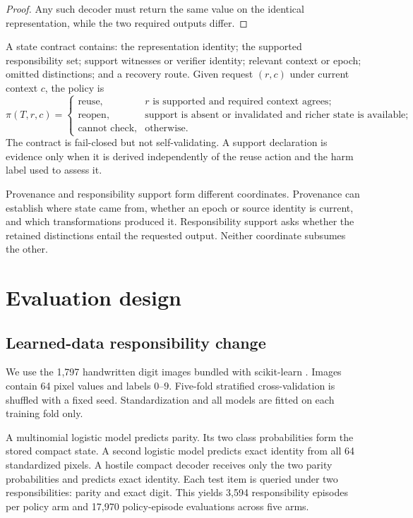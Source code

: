 \documentclass[10pt]{article}
\begin{document}
\begin{proof}
Any such decoder must return the same value on the identical representation, while the two required outputs differ.
\end{proof}

A state contract contains: the representation identity; the supported responsibility set; support witnesses or verifier identity; relevant context or epoch; omitted distinctions; and a recovery route. Given request $(r,c)$ under current context $c$, the policy is
\[
\pi(T,r,c)=
\begin{cases}
\text{reuse}, & r\text{ is supported and required context agrees};\\
\text{reopen}, & \text{support is absent or invalidated and richer state is available};\\
\text{cannot check}, & \text{otherwise}.
\end{cases}
\]
The contract is fail-closed but not self-validating. A support declaration is evidence only when it is derived independently of the reuse action and the harm label used to assess it.

Provenance and responsibility support form different coordinates. Provenance can establish where state came from, whether an epoch or source identity is current, and which transformations produced it. Responsibility support asks whether the retained distinctions entail the requested output. Neither coordinate subsumes the other.

\section{Evaluation design}

\subsection{Learned-data responsibility change}

We use the 1,797 handwritten digit images bundled with scikit-learn \citep{pedregosa2011scikit}. Images contain 64 pixel values and labels $0$--$9$. Five-fold stratified cross-validation is shuffled with a fixed seed. Standardization and all models are fitted on each training fold only.

A multinomial logistic model predicts parity. Its two class probabilities form the stored compact state. A second logistic model predicts exact identity from all 64 standardized pixels. A hostile compact decoder receives only the two parity probabilities and predicts exact identity. Each test item is queried under two responsibilities: parity and exact digit. This yields 3,594 responsibility episodes per policy arm and 17,970 policy-episode evaluations across five arms.
\end{document}

